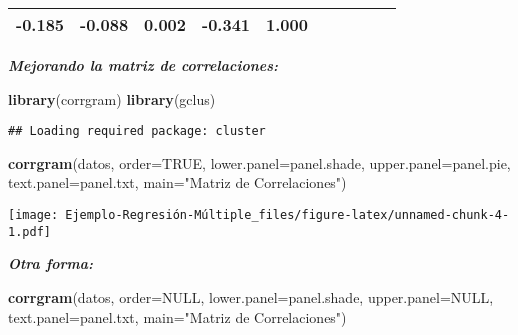 \documentclass[]{article}
\newenvironment{Shaded}{\begin{snugshade}}{\end{snugshade}}
\newcommand{\KeywordTok}[1]{\textcolor[rgb]{0.13,0.29,0.53}{\textbf{#1}}}
\newcommand{\DataTypeTok}[1]{\textcolor[rgb]{0.13,0.29,0.53}{#1}}
\newcommand{\StringTok}[1]{\textcolor[rgb]{0.31,0.60,0.02}{#1}}
\newcommand{\OtherTok}[1]{\textcolor[rgb]{0.56,0.35,0.01}{#1}}
\newcommand{\NormalTok}[1]{#1}
\begin{document}
\begin{longtable}[]{@{}lrrrrrrrrr@{}}
\begin{minipage}[t]{0.05\columnwidth}
-0.185\strut
\end{minipage} & \begin{minipage}[t]{0.07\columnwidth}\raggedleft\strut
-0.088\strut
\end{minipage} & \begin{minipage}[t]{0.06\columnwidth}\raggedleft\strut
0.002\strut
\end{minipage} & \begin{minipage}[t]{0.05\columnwidth}\raggedleft\strut
-0.341\strut
\end{minipage} & \begin{minipage}[t]{0.10\columnwidth}\raggedleft\strut
1.000\strut
\end{minipage}\tabularnewline
\bottomrule
\end{longtable}

\emph{\textbf{Mejorando la matriz de correlaciones:}}

\begin{Shaded}
\begin{Highlighting}[]
\KeywordTok{library}\NormalTok{(corrgram)}
\KeywordTok{library}\NormalTok{(gclus)}
\end{Highlighting}
\end{Shaded}

\begin{verbatim}
## Loading required package: cluster
\end{verbatim}

\begin{Shaded}
\begin{Highlighting}[]
\KeywordTok{corrgram}\NormalTok{(datos, }\DataTypeTok{order=}\OtherTok{TRUE}\NormalTok{, }\DataTypeTok{lower.panel=}\NormalTok{panel.shade,}
         \DataTypeTok{upper.panel=}\NormalTok{panel.pie, }\DataTypeTok{text.panel=}\NormalTok{panel.txt,}
         \DataTypeTok{main=}\StringTok{"Matriz de Correlaciones"}\NormalTok{)}
\end{Highlighting}
\end{Shaded}

\texttt{[image: Ejemplo-Regresión-Múltiple\_files/figure-latex/unnamed-chunk-4-1.pdf]}

\emph{\textbf{Otra forma:}}

\begin{Shaded}
\begin{Highlighting}[]
\KeywordTok{corrgram}\NormalTok{(datos, }\DataTypeTok{order=}\OtherTok{NULL}\NormalTok{, }\DataTypeTok{lower.panel=}\NormalTok{panel.shade,}
         \DataTypeTok{upper.panel=}\OtherTok{NULL}\NormalTok{, }\DataTypeTok{text.panel=}\NormalTok{panel.txt,}
         \DataTypeTok{main=}\StringTok{"Matriz de Correlaciones"}\NormalTok{)}
\end{Highlighting}
\end{Shaded}
\end{document}
